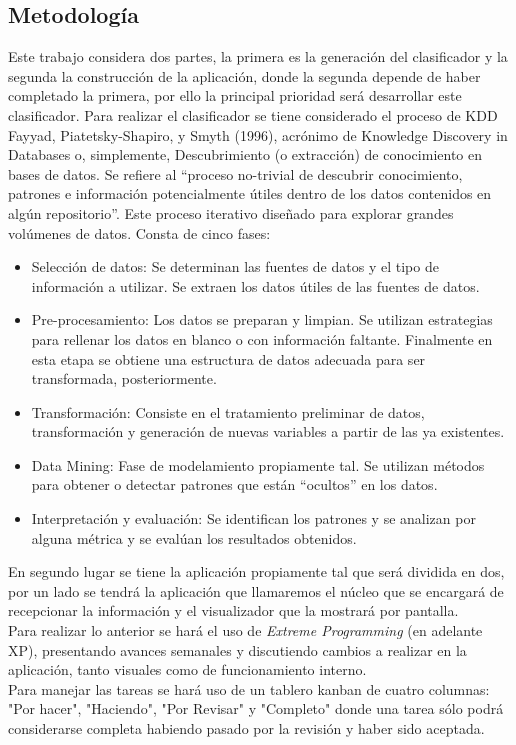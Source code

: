 \subsection{Metodolog\'ia}
Este trabajo considera dos partes, la primera es la generación del clasificador y la segunda la construcción de la aplicación, donde la segunda depende de haber completado la primera, por ello la principal prioridad será desarrollar este clasificador.
Para realizar el clasificador se tiene considerado el proceso de KDD Fayyad, Piatetsky-Shapiro, y Smyth (1996), acrónimo de Knowledge Discovery in Databases o, simplemente, Descubrimiento (o extracción) de conocimiento en bases de datos. Se refiere al “proceso no-trivial de descubrir conocimiento, patrones e información potencialmente útiles dentro de los datos contenidos en algún repositorio”. Este proceso iterativo diseñado para explorar grandes volúmenes de datos. Consta de cinco fases:
\begin{itemize}
\item	Selección de datos: Se determinan las fuentes de datos y el tipo de información a utilizar. Se extraen los datos útiles de las fuentes de datos.
\item	Pre-procesamiento: Los datos se preparan y limpian. Se utilizan estrategias para rellenar los datos en blanco o con información faltante. Finalmente en esta etapa se obtiene una estructura de datos adecuada para ser transformada, posteriormente.
\item	Transformación: Consiste en el tratamiento preliminar de datos, transformación y generación de nuevas variables a partir de las ya existentes. 
\item	Data Mining: Fase de modelamiento propiamente tal. Se utilizan métodos para obtener o detectar patrones que están “ocultos” en los datos.
\item	Interpretación y evaluación: Se identifican los patrones y se analizan por alguna métrica y se evalúan los resultados obtenidos.
\end{itemize}
En segundo lugar se tiene la aplicación propiamente tal que será dividida en dos, por un lado se tendrá la aplicación que llamaremos el núcleo que se encargará de recepcionar la información y el visualizador que la mostrará por pantalla.\\Para realizar lo anterior se hará el uso de \textit{Extreme Programming} (en adelante XP), presentando avances semanales y discutiendo cambios a realizar en la aplicación, tanto visuales como de funcionamiento interno.\\Para manejar las tareas se hará uso de un tablero kanban de cuatro columnas: "Por hacer", "Haciendo", "Por Revisar" y "Completo" donde una tarea sólo podrá considerarse completa habiendo pasado por la revisión y haber sido aceptada.

